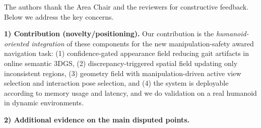 \documentclass[conference]{IEEEtran}
\begin{document}

The authors thank the Area Chair and the reviewers for constructive feedback. Below we address the key concerns.

\textbf{1) Contribution (novelty/positioning).}
Our contribution is the \emph{humanoid-oriented integration} of these components for the new manipulation-safety awared navigation task: (1) confidence-gated appearance field reducing gait artifacts in online semantic 3DGS, (2) discrepancy-triggered spatial field updating only inconsistent regions, (3) geometry field with manipulation-driven active view selection and interaction pose selection, and (4) the system is deployable according to memory usage and latency, and we do validation on a real humanoid in dynamic environments.




\textbf{2) Additional evidence on the main disputed points.}

\end{document}

